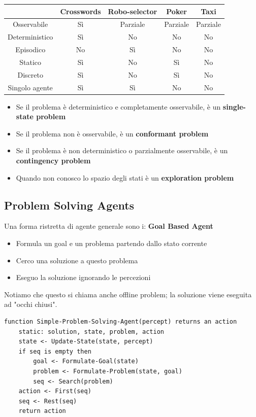 \documentclass[a4paper]{article}
\begin{document}
\begin{table}[H]
    \centering
    \begin{tabular}{|c|c|c|c|c|}
        \hline
        & Crosswords & Robo-selector & Poker & Taxi \\
        \hline
        Osservabile & Sì  & Parziale & Parziale & Parziale \\
        Deterministico & Sì & No & No &  No\\
        Episodico & No & Sì & No & No\\
        Statico & Sì & No & Sì & No \\
        Discreto & Sì & No & Sì & No \\
        Singolo agente & Sì & Sì & No & No\\
        \hline
    \end{tabular}
\end{table}

\begin{itemize}
    \item Se il problema è deterministico e completamente osservabile, è un \textbf{single-state problem}
    \item Se il problema non è osservabile, è un \textbf{conformant problem}
    \item Se il problema è non deterministico o parzialmente osservabile, è un \textbf{contingency problem}
    \item Quando non conosco lo spazio degli stati è un \textbf{exploration problem}
\end{itemize}

\subsection{Problem Solving Agents}

Una forma ristretta di agente generale sono i: \textbf{Goal Based Agent}
\begin{itemize}
    \item Formula un goal e un problema partendo dallo stato corrente
    \item Cerco una soluzione a questo problema
    \item Eseguo la soluzione ignorando le percezioni
\end{itemize}
Notiamo che questo si chiama anche offline problem; la soluzione viene eseguita ad "occhi chiusi".
\begin{verbatim}
function Simple-Problem-Solving-Agent(percept) returns an action
    static: solution, state, problem, action
    state <- Update-State(state, percept)
    if seq is empty then
        goal <- Formulate-Goal(state)
        problem <- Formulate-Problem(state, goal)
        seq <- Search(problem)
    action <- First(seq)
    seq <- Rest(seq)
    return action
\end{verbatim}
\end{document}
